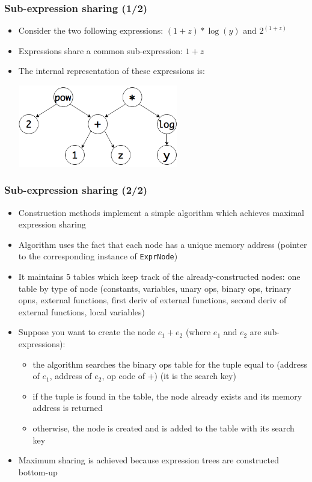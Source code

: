 \documentclass{beamer}
\begin{document}
\begin{frame}
  \frametitle{Sub-expression sharing (1/2)}
  \begin{itemize}
  \item Consider the two following expressions: $(1+z)*\log(y)$ and $2^{(1+z)}$
  \item Expressions share a common sub-expression: $1+z$
  \item The internal representation of these expressions is:
    \begin{center}
      \includegraphics[width=7cm]{expr-sharing.png}
    \end{center}
  \end{itemize}
\end{frame}

\begin{frame}
  \frametitle{Sub-expression sharing (2/2)}
  \begin{itemize}
  \item Construction methods implement a simple algorithm which achieves maximal expression sharing
  \item Algorithm uses the fact that each node has a unique memory address (pointer to the corresponding instance of \texttt{ExprNode})
  \item It maintains 5 tables which keep track of the already-constructed nodes: one table by type of node (constants, variables, unary ops, binary ops, trinary opns, external functions, first deriv of external functions, second deriv of external functions, local variables)
  \item Suppose you want to create the node $e_1+e_2$ (where $e_1$ and $e_2$ are sub-expressions):
    \begin{itemize}
    \item the algorithm searches the binary ops table for the tuple equal to (address of $e_1$, address of $e_2$, op code of +) (it is the \alert{search key})
    \item if the tuple is found in the table, the node already exists and its memory address is returned
    \item otherwise, the node is created and is added to the table with its search key
    \end{itemize}
  \item Maximum sharing is achieved because expression trees are constructed bottom-up
  \end{itemize}
\end{frame}
\end{document}
